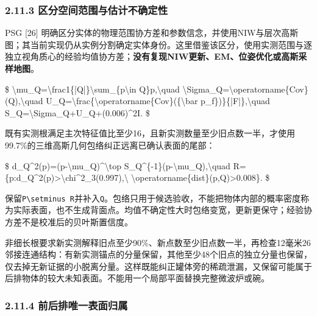 \documentclass[UTF8,fontset=fandol]{ctexart}
\begin{document}
\subsubsection*{2.11.3 区分空间范围与估计不确定性}

PSG [26] 明确区分实体的物理范围协方差和参数信念，并使用NIW与层次高斯图；其当前实现仍从实例分割确定实体身份。这里借鉴该区分，使用实测范围与逐独立视角质心的经验均值协方差；\textbf{没有复现NIW更新、EM、位姿优化或高斯采样地图}。



\$
\textbackslash{}mu\_Q=\textbackslash{}frac1\{|Q|\}\textbackslash{}sum\_\{p\textbackslash{}in Q\}p,\textbackslash{}quad \textbackslash{}Sigma\_Q=\textbackslash{}operatorname\{Cov\}(Q),\textbackslash{}quad U\_Q=\textbackslash{}frac\{\textbackslash{}operatorname\{Cov\}(\{\textbackslash{}bar p\_f\})\}\{|F|\},\textbackslash{}quad S\_Q=\textbackslash{}Sigma\_Q+U\_Q+(0.006)\textasciicircum{}2I.
\$



既有实测根满足主次特征值比至少16，且新实测数量至少旧点数一半，才使用99.7\%的三维高斯几何包络纠正远离已确认表面的尾部：



\$
d\_Q\textasciicircum{}2(p)=(p-\textbackslash{}mu\_Q)\textasciicircum{}\textbackslash{}top S\_Q\textasciicircum{}\{-1\}(p-\textbackslash{}mu\_Q),\textbackslash{}quad R=\{p:d\_Q\textasciicircum{}2(p)>\textbackslash{}chi\textasciicircum{}2\_3(0.997),\textbackslash{} \textbackslash{}operatorname\{dist\}(p,Q)>0.008\}.
\$



保留\texttt{P\textbackslash{}setminus R}并补入\texttt{Q}。包络只用于候选验收，不能把物体内部的概率密度称为实际表面，也不生成背面点。均值不确定性大时包络变宽，更新更保守；经验协方差不是校准后的贝叶斯置信度。



非细长根要求新实测解释旧点至少90\%、新点数至少旧点数一半，再检查12毫米26邻接连通结构：有新实测锚点的分量保留，其他至少48个旧点的独立分量也保留，仅去掉无新证据的小脱离分量。这样既能纠正罐体旁的稀疏泄漏，又保留可能属于后排物体的较大未知表面。不能用一个局部平面替换完整微波炉或碗。



\subsubsection*{2.11.4 前后排唯一表面归属}
\end{document}
